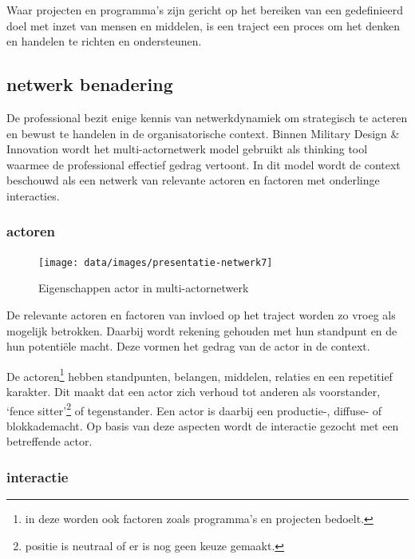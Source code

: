 \documentclass[
]{book}
\begin{document}
Waar projecten en programma's zijn gericht op het bereiken van een gedefinieerd doel met inzet van mensen en middelen, is een traject een proces om het denken en handelen te richten en ondersteunen.

\hypertarget{netwerk-benadering}{%
\subsection{netwerk benadering}\label{netwerk-benadering}}

De professional bezit enige kennis van netwerkdynamiek om strategisch te acteren en bewust te handelen in de organisatorische context. Binnen Military Design \& Innovation wordt het multi-actornetwerk model gebruikt als thinking tool waarmee de professional effectief gedrag vertoont. In dit model wordt de context beschouwd als een netwerk van relevante actoren en factoren met onderlinge interacties.

\hypertarget{actoren-1}{%
\subsubsection{actoren}\label{actoren-1}}

\begin{figure}

{\centering \texttt{[image: data/images/presentatie-netwerk7]} 

}

\caption{Eigenschappen actor in multi-actornetwerk}\label{fig:actoren}
\end{figure}

De relevante actoren en factoren van invloed op het traject worden zo vroeg als mogelijk betrokken. Daarbij wordt rekening gehouden met hun standpunt en de hun potentiële macht. Deze vormen het gedrag van de actor in de context.

De actoren\footnote{in deze worden ook factoren zoals programma's en projecten bedoelt.} hebben standpunten, belangen, middelen, relaties en een repetitief karakter. Dit maakt dat een actor zich verhoud tot anderen als voorstander, `fence sitter'\footnote{positie is neutraal of er is nog geen keuze gemaakt.} of tegenstander. Een actor is daarbij een productie-, diffuse- of blokkademacht. Op basis van deze aspecten wordt de interactie gezocht met een betreffende actor.

\hypertarget{interactie}{%
\subsubsection{interactie}\label{interactie}}
\end{document}
